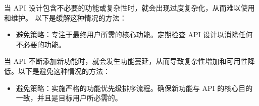 当 API 设计包含不必要的功能或复杂性时，就会出现过度复杂化，从而难以使用和维护。
以下是缓解这种情况的方法：

\begin{itemize}
\item
避免策略：专注于最终用户所需的核心功能。定期检查 API 设计以消除任何不必要的功能。
\end{itemize}

当 API 不断添加新功能时，就会发生功能蔓延，从而导致复杂性增加和可用性降低。以下是避免这种情况的方法：

\begin{itemize}
\item
避免策略：实施严格的功能优先级排序流程。确保新功能与 API 的核心目的一致，并且是目标用户所必需的。
\end{itemize}